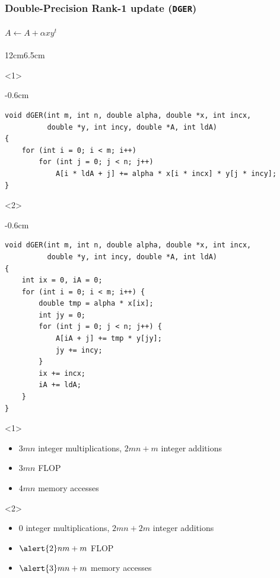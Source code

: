 \documentclass[xcolor={rgb,x11names,svgnames},rgb,x11names,svgnames]{beamer}
\newenvironment{wider}{%
\begin{adjustwidth}{-0.6cm}{}%
  \begin{minipage}{12cm}%
}{%
\end{minipage}%
\end{adjustwidth}%
}
\begin{document}
\begin{frame}[label=ger,fragile]
  \frametitle{Double-Precision Rank-1 update (\texttt{DGER})}
  \framesubtitle{$A \gets A + \alpha x y^t$}

  \vspace*{-2ex}
  
  \begin{overlayarea}{12cm}{6.5cm}
    \begin{onlyenv}<1>
      \begin{wider}
  \begin{verbatim}
void dGER(int m, int n, double alpha, double *x, int incx,
          double *y, int incy, double *A, int ldA)
{
    for (int i = 0; i < m; i++)
        for (int j = 0; j < n; j++)
            A[i * ldA + j] += alpha * x[i * incx] * y[j * incy];
}
  \end{verbatim}
\end{wider}
\end{onlyenv}

\begin{onlyenv}<2>
  \begin{wider}
    \begin{verbatim}
void dGER(int m, int n, double alpha, double *x, int incx,
          double *y, int incy, double *A, int ldA)
{
    int ix = 0, iA = 0;
    for (int i = 0; i < m; i++) {
        double tmp = alpha * x[ix];
        int jy = 0;
        for (int j = 0; j < n; j++) {
            A[iA + j] += tmp * y[jy];
            jy += incy;
        }
        ix += incx;
        iA += ldA;    
    }
}
        \end{verbatim}
      \end{wider}
    \end{onlyenv}
  \end{overlayarea}

  \begin{onlyenv}<1>
    \begin{itemize}
    \item $3mn$ integer multiplications, $2mn + m$ integer additions
    \item $3mn$ FLOP
    \item $4mn$ memory accesses
    \end{itemize}
  \end{onlyenv}

  \begin{onlyenv}<2>
    \begin{itemize}
    \item \alert{0} integer multiplications, $2mn + 2m$ integer additions
    \item $\alert{2}nm + m$ FLOP
    \item $\alert{3}mn + m$ memory accesses
    \end{itemize}
  \end{onlyenv}
\end{frame}
\end{document}

